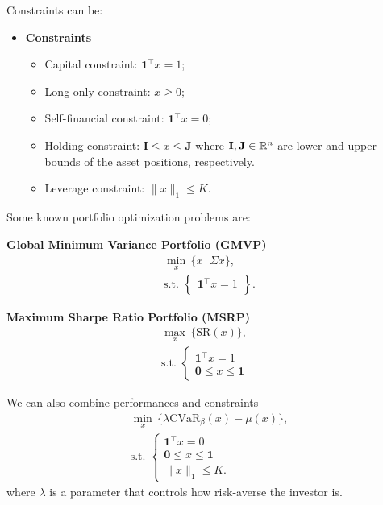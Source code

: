 Constraints can be:

\begin{itemize}
	\item \textbf{Constraints}
	      \begin{itemize}
		      \item Capital constraint: $\textbf{1}^\top x=1$;
		      \item Long-only constraint: $x\geq0$;
		      \item Self-financial constraint: $\textbf{1}^\top x=0$;
		      \item Holding constraint: $\mathbf{I}\leq x\leq \mathbf{J}$ where $\mathbf{I},\mathbf{J}\in\mathbb{R}^n$ are lower and upper bounds of the asset positions, respectively.
		      \item Leverage constraint: $\|x\|_1\leq K$.
	      \end{itemize}
\end{itemize}

Some known portfolio optimization problems are:

\noindent\textbf{Global Minimum Variance Portfolio (GMVP)}
\begin{eqnarray}\label{prob:GMVP}
	\min_{x} \,\{x^\top \Sigma x\}, \\
	\mbox{s.t. }\left\{
	\begin{aligned}\nonumber
		\mathbf{1}^\top x=1 \\
	\end{aligned}
	\right\}.
\end{eqnarray}

\noindent\textbf{Maximum Sharpe Ratio Portfolio (MSRP)}
\begin{eqnarray}\label{prob:MSRP}
	\max_{x} \,\{\mbox{SR}(x)\}, \\
	\mbox{s.t. }\left\{
	\begin{aligned}\nonumber
		\mathbf{1}^\top x=1 & \\
		\mathbf{0}\leq x \leq \mathbf{1}
	\end{aligned}
	\right.
\end{eqnarray}

We can also combine performances and constraints
\begin{eqnarray}\label{prob:General}
	\min_{x} \,\{\lambda \mbox{CVaR}_\beta(x) - \mu(x)\}, \\
	\mbox{s.t. }\left\{
	\begin{aligned}\nonumber
		\mathbf{1}^\top x=0 & \\
		\mathbf{0}\leq x \leq \mathbf{1}\\
		\|x\|_1\leq K.
	\end{aligned}
	\right.
\end{eqnarray}
where $\lambda$ is a parameter that controls how risk-averse the investor is.

